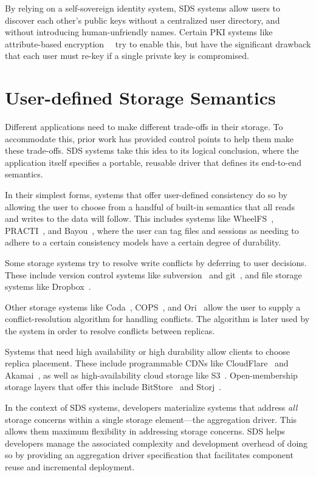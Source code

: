 By relying on a self-sovereign identity system, SDS systems allow users to
discover each other's public keys without a centralized user directory, and
without introducing human-unfriendly names.  Certain PKI systems like
attribute-based encryption~\cite{ibe-shamir}~\cite{ibe-weil} try to enable this, but have the significant
drawback that each user must re-key if a single private key is compromised.

\section{User-defined Storage Semantics}

Different applications need to make different trade-offs in their storage.  To
accommodate this, prior work has provided
control points to help them make these trade-offs.  SDS systems take
this idea to its logical conclusion, where the application itself specifies a
portable, reusable driver that defines its end-to-end semantics.

In their simplest forms, systems that offer user-defined consistency do so by
allowing the user to choose from a handful of built-in semantics that all reads
and writes to the data will follow.  This includes systems like
WheelFS~\cite{wheelfs}, PRACTI~\cite{practi}, and
Bayou~\cite{bayou}, where the user can tag files and sessions as needing to
adhere to a certain consistency models have a certain degree of
durability.

Some storage systems try to resolve write conflicts by deferring to user
decisions.  These include version control systems like
subversion~\cite{subversion} and git~\cite{git}, and file storage systems like
Dropbox~\cite{dropbox}.

Other storage systems like Coda~\cite{coda}, COPS~\cite{cops}, and
Ori~\cite{ori} allow the user to supply a conflict-resolution algorithm for
handling conflicts.  The algorithm is later used by the system in order to
resolve conflicts between replicas.

Systems that need high availability or high durability allow clients to choose
replica placement.  These include programmable CDNs like
CloudFlare~\cite{cloudflare} and Akamai~\cite{akamai}, as well as
high-availability cloud storage like S3~\cite{s3}.  Open-membership storage
layers that offer this include BitStore~\cite{bitstore} and Storj~\cite{storj}.

In the context of SDS systems, developers materialize systems that address
\emph{all} storage concerns within a single storage element---the aggregation
driver.  This allows them maximum flexibility in addressing storage concerns.
SDS helps developers manage the associated complexity and development overhead
of doing so by providing an aggregation driver specification that facilitates
component reuse and incremental deployment.

